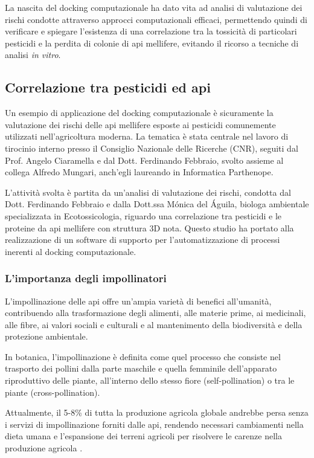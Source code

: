 La nascita del docking computazionale ha dato vita ad analisi di valutazione dei rischi condotte attraverso approcci computazionali efficaci, permettendo quindi di verificare e spiegare l'esistenza di una correlazione tra la tossicità di particolari pesticidi e la perdita di colonie di api mellifere, evitando il ricorso a tecniche di analisi \textit{in vitro}.
\subsection{Correlazione tra pesticidi ed api} \label{Apis mellifera}
Un esempio di applicazione del docking computazionale è sicuramente la valutazione dei rischi delle api mellifere esposte ai pesticidi comunemente utilizzati nell'agricoltura moderna.
La tematica è stata centrale nel lavoro di tirocinio interno presso il Consiglio Nazionale delle Ricerche (CNR), seguiti dal Prof. Angelo Ciaramella e dal Dott. Ferdinando Febbraio, svolto assieme al collega Alfredo Mungari, anch'egli laureando in Informatica Parthenope. 

L'attività svolta è partita da un'analisi di valutazione dei rischi,
condotta dal Dott. Ferdinando Febbraio e dalla Dott.ssa Mónica del Águila, biologa ambientale specializzata in Ecotossicologia, riguardo una correlazione tra pesticidi e le proteine da api mellifere con struttura 3D nota. Questo studio ha portato alla realizzazione di un software di supporto per l'automatizzazione di processi inerenti al docking computazionale.

\subsubsection{L'importanza degli impollinatori}
L'impollinazione delle api offre un'ampia varietà di benefici all'umanità, contribuendo alla trasformazione degli alimenti, alle materie prime, ai medicinali, alle fibre, ai valori sociali e culturali e al mantenimento della biodiversità e della protezione ambientale.

In botanica, l’impollinazione è definita come quel processo che consiste nel trasporto dei pollini dalla parte maschile e quella femminile dell’apparato riproduttivo delle piante, all'interno dello stesso fiore (self-pollination) o tra le piante (cross-pollination). 

Attualmente, il 5-8\% di tutta la produzione agricola globale andrebbe persa senza i servizi di impollinazione forniti dalle api, rendendo necessari cambiamenti nella dieta umana e l'espansione dei terreni agricoli per risolvere le carenze nella produzione agricola \cite{khalifa_overview_2021}. 

